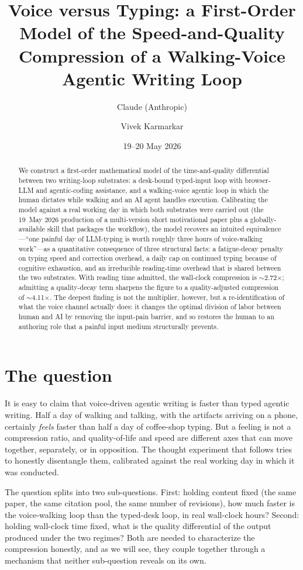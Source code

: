 \documentclass[11pt]{article}
\title{Voice versus Typing: a First-Order Model of the Speed-and-Quality\\ Compression of a Walking-Voice Agentic Writing Loop}
\author{Claude (Anthropic) \and Vivek Karmarkar}
\date{19--20 May 2026}
\begin{document}
\maketitle

\begin{abstract}
\noindent We construct a first-order mathematical model of the time-and-quality differential between two writing-loop substrates: a desk-bound typed-input loop with browser-LLM and agentic-coding assistance, and a walking-voice agentic loop in which the human dictates while walking and an AI agent handles execution. Calibrating the model against a real working day in which both substrates were carried out (the 19~May 2026 production of a multi-version short motivational paper plus a globally-available skill that packages the workflow), the model recovers an intuited equivalence---``one painful day of LLM-typing is worth roughly three hours of voice-walking work''---as a quantitative consequence of three structural facts: a fatigue-decay penalty on typing speed and correction overhead, a daily cap on continued typing because of cognitive exhaustion, and an irreducible reading-time overhead that is shared between the two substrates. With reading time admitted, the wall-clock compression is $\sim$2.72$\times$; admitting a quality-decay term sharpens the figure to a quality-adjusted compression of $\sim$4.11$\times$. The deepest finding is not the multiplier, however, but a re-identification of what the voice channel actually does: it changes the optimal division of labor between human and AI by removing the input-pain barrier, and so restores the human to an authoring role that a painful input medium structurally prevents.
\end{abstract}

\section{The question}

It is easy to claim that voice-driven agentic writing is faster than typed agentic writing. Half a day of walking and talking, with the artifacts arriving on a phone, certainly \emph{feels} faster than half a day of coffee-shop typing. But a feeling is not a compression ratio, and quality-of-life and speed are different axes that can move together, separately, or in opposition. The thought experiment that follows tries to honestly disentangle them, calibrated against the real working day in which it was conducted.

The question splits into two sub-questions. First: holding content fixed (the same paper, the same citation pool, the same number of revisions), how much faster is the voice-walking loop than the typed-desk loop, in real wall-clock hours? Second: holding wall-clock time fixed, what is the quality differential of the output produced under the two regimes? Both are needed to characterize the compression honestly, and as we will see, they couple together through a mechanism that neither sub-question reveals on its own.
\end{document}
